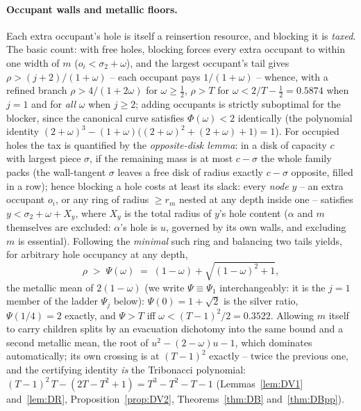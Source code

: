 \documentclass[11pt]{article}
\theoremstyle{definition}
\begin{document}
\paragraph{Occupant walls and metallic floors.}
Each extra occupant's hole is itself a reinsertion resource, and blocking it
is \emph{taxed}. The basic count: with free holes, blocking forces every
extra occupant to within one width of $m$ ($o_i<\sigma_2+\omega$), and the
largest occupant's tail gives
$\rho>(j+2)/(1+\omega)$ -- each occupant pays $1/(1+\omega)$ -- whence, with
a refined branch $\rho>4/(1+2\omega)$ for $\omega\ge\tfrac12$,
$\rho>T$ for $\omega<2/T-\tfrac12=0.5874$ when $j=1$ and for \emph{all}
$\omega$ when $j\ge2$; adding occupants is strictly suboptimal for the
blocker, since the canonical curve satisfies $\Phi(\omega)<2$ identically
(the polynomial identity
$(2+\omega)^3-(1+\omega)\bigl((2+\omega)^2+(2+\omega)+1\bigr)=1$).
For occupied holes the tax is quantified by the \emph{opposite-disk lemma}:
in a disk of capacity $c$ with largest piece $\sigma$, if the remaining mass
is at most $c-\sigma$ the whole family packs (the wall-tangent $\sigma$
leaves a free disk of radius exactly $c-\sigma$ opposite, filled in a row);
hence blocking a hole costs at least its slack: every \emph{node} $y$ --
an extra occupant $o_i$, or any ring of radius $\ge r_m$ nested at any
depth inside one -- satisfies $y<\sigma_2+\omega+X_y$, where $X_y$ is the
total radius of $y$'s hole content
($\alpha$ and $m$ themselves are excluded: $\alpha$'s hole is $u$, governed
by its own walls, and excluding $m$ is essential). Following the
\emph{minimal} such ring and balancing two tails yields, for arbitrary hole
occupancy at any depth,
\[
\rho\;>\;\Psi(\omega)\;=\;(1-\omega)+\sqrt{(1-\omega)^2+1} ,
\]
the metallic mean of $2(1-\omega)$ (we write $\Psi\equiv\Psi_1$
interchangeably: it is the $j=1$ member of the ladder $\Psi_j$ below):
$\Psi(0)=1+\sqrt2$ is the silver ratio,
$\Psi(1/4)=2$ exactly, and $\Psi>T$ iff $\omega<(T-1)^2/2=0.3522$.
Allowing $m$ itself to carry children splits by an evacuation dichotomy into
the same bound and a second metallic mean, the root of
$u^2-(2-\omega)u-1$, which dominates automatically; its own crossing is at
$(T-1)^2$ exactly -- twice the previous one, and the certifying identity
\emph{is} the Tribonacci polynomial:
$(T-1)^2\,T-(2T-T^2+1)=T^3-T^2-T-1$
(Lemmas~\ref{lem:DV1} and~\ref{lem:DR}, Proposition~\ref{prop:DV2},
Theorems~\ref{thm:DB} and~\ref{thm:DBpp}).
\end{document}
